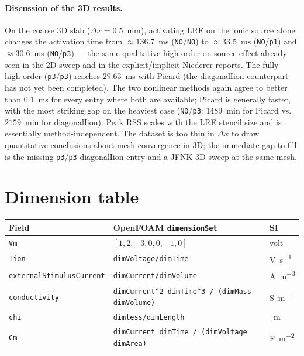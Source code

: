 \documentclass[11pt,a4paper]{article}
\newcommand{\code}[1]{\texttt{\small #1}}
\begin{document}
\paragraph{Discussion of the 3D results.}
On the coarse 3D slab ($\Delta x = 0.5$~mm), activating LRE on the
ionic source alone changes the activation time from $\approx 136.7$~ms
(\code{NO}/\code{NO}) to $\approx 33.5$~ms (\code{NO}/\code{p1}) and
$\approx 30.6$~ms (\code{NO}/\code{p3}) --- the same qualitative
high-order-on-source effect already seen in the 2D sweep and in the
explicit/implicit Niederer reports. The fully high-order
(\code{p3}/\code{p3}) reaches $29.63$~ms with Picard (the diagonalIion
counterpart has not yet been completed). The two nonlinear methods
again agree to better than $0.1$~ms for every entry where both are
available; Picard is generally faster, with the most striking gap on
the heaviest case (\code{NO}/\code{p3}: $1489$~min for Picard vs.\
$2159$~min for diagonalIion). Peak RSS scales with the LRE stencil
size and is essentially method-independent. The dataset is too thin
in $\Delta x$ to draw quantitative conclusions about mesh convergence
in 3D; the immediate gap to fill is the missing \code{p3}/\code{p3}
diagonalIion entry and a JFNK 3D sweep at the same mesh.

\appendix
\section{Dimension table}

\begin{center}
\begin{tabular}{@{}lll@{}}
\toprule
Field & OpenFOAM \code{dimensionSet} & SI \\
\midrule
\code{Vm} & $[1, 2, -3, 0, 0, -1, 0]$ & volt \\
\code{Iion} & \code{dimVoltage/dimTime} & \si{\volt\per\second} \\
\code{externalStimulusCurrent} & \code{dimCurrent/dimVolume} &
    \si{\ampere\per\meter\cubed} \\
\code{conductivity} &
    \code{dimCurrent\^{}2 dimTime\^{}3 / (dimMass dimVolume)} &
    \si{\siemens\per\meter} \\
\code{chi} & \code{dimless/dimLength} & \si{\per\meter} \\
\code{Cm} & \code{dimCurrent dimTime / (dimVoltage dimArea)} &
    \si{\farad\per\meter\squared} \\
\bottomrule
\end{tabular}
\end{center}
\end{document}
